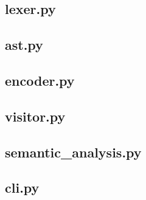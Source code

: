 \documentclass[a4paper,8pt]{article}
\begin{document}
\subsection{lexer.py}
\begin{small}
  
\end{small}
\newpage
\subsection{ast.py}
\begin{small}
  
\end{small}
\newpage
\subsection{encoder.py}
\begin{small}
  
\end{small}
\newpage
\subsection{visitor.py}
\begin{small}
  
\end{small}
\newpage
\subsection{semantic\_analysis.py}
\begin{small}
  
\end{small}
\newpage
\subsection{cli.py}
\begin{small}
  
\end{small}
\newpage
\end{document}
